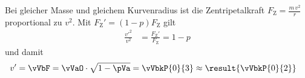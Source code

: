 Bei gleicher Masse und gleichem Kurvenradius ist die Zentripetalkraft $F_\mathrm{Z} = \frac{m\,v^2}{r}$ proportional zu $v^2$. Mit $F_\mathrm{Z}' = \left(1-p\right)F_\mathrm{Z}$ gilt
\begin{align}
 \frac{v'^2}{v^2} &= \frac{F_\mathrm{Z}'}{F_\mathrm{Z}} = 1-p
\end{align}
und damit
\begin{align}
 v' &= \vVbF = \vVaO\cdot\sqrt{1-\pVa} = \vVbkP{0}{3} \approx \result{\vVbkP{0}{2}}
\end{align}
